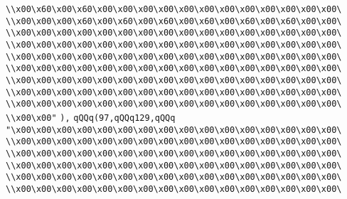 \verb|\\x00\x60\x00\x60\x00\x00\x00\x00\x00\x00\x00\x00\x00\x00\x00\x00\|\newline
\verb|\\x00\x00\x00\x60\x00\x60\x00\x60\x00\x60\x00\x60\x00\x60\x00\x00\|\newline
\verb|\\x00\x00\x00\x00\x00\x00\x00\x00\x00\x00\x00\x00\x00\x00\x00\x00\|\newline
\verb|\\x00\x00\x00\x00\x00\x00\x00\x00\x00\x00\x00\x00\x00\x00\x00\x00\|\newline
\verb|\\x00\x00\x00\x00\x00\x00\x00\x00\x00\x00\x00\x00\x00\x00\x00\x00\|\newline
\verb|\\x00\x00\x00\x00\x00\x00\x00\x00\x00\x00\x00\x00\x00\x00\x00\x00\|\newline
\verb|\\x00\x00\x00\x00\x00\x00\x00\x00\x00\x00\x00\x00\x00\x00\x00\x00\|\newline
\verb|\\x00\x00\x00\x00\x00\x00\x00\x00\x00\x00\x00\x00\x00\x00\x00\x00\|\newline
\verb|\\x00\x00\x00\x00\x00\x00\x00\x00\x00\x00\x00\x00\x00\x00\x00\x00\|\newline
\verb|\\x00\x00"|\newline
\verb|),|\newline
\verb|qQQq(97,qQQq129,qQQq|\newline
\verb|"\x00\x00\x00\x00\x00\x00\x00\x00\x00\x00\x00\x00\x00\x00\x00\x00\|\newline
\verb|\\x00\x00\x00\x00\x00\x00\x00\x00\x00\x00\x00\x00\x00\x00\x00\x00\|\newline
\verb|\\x00\x00\x00\x00\x00\x00\x00\x00\x00\x00\x00\x00\x00\x00\x00\x00\|\newline
\verb|\\x00\x00\x00\x00\x00\x00\x00\x00\x00\x00\x00\x00\x00\x00\x00\x00\|\newline
\verb|\\x00\x00\x00\x00\x00\x00\x00\x00\x00\x00\x00\x00\x00\x00\x00\x00\|\newline
\verb|\\x00\x00\x00\x00\x00\x00\x00\x00\x00\x00\x00\x00\x00\x00\x00\x00\|\newline
